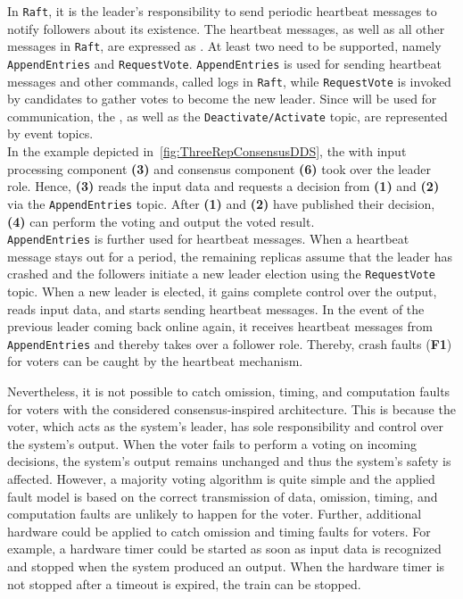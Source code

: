 In \texttt{Raft}, it is the leader's responsibility to send periodic heartbeat messages to notify followers about its existence.
The heartbeat messages, as well as all other messages in \texttt{Raft}, are expressed as .
At least two  need to be supported, namely \texttt{AppendEntries} and \texttt{RequestVote}.
\texttt{AppendEntries} is used for sending heartbeat messages and other commands, called logs in \texttt{Raft}, while \texttt{RequestVote} is invoked by candidates to gather votes to become the new leader.
Since  will be used for communication, the , as well as the \texttt{Deactivate/Activate} topic, are represented by  event topics.
\\

In the example depicted in~\autoref{fig:ThreeRepConsensusDDS}, the  with input processing component \textbf{(3)} and consensus component \textbf{(6)} took over the leader role.
Hence, \textbf{(3)} reads the input data and requests a decision from \textbf{(1)} and \textbf{(2)} via the \texttt{AppendEntries} topic.
After \textbf{(1)} and \textbf{(2)} have published their decision, \textbf{(4)} can perform the voting and output the voted result.
\\

\texttt{AppendEntries} is further used for heartbeat messages.
When a heartbeat message stays out for a period, the remaining replicas assume that the leader has crashed and the followers initiate a new leader election using the \texttt{RequestVote} topic.
When a new leader is elected, it gains complete control over the output, reads input data, and starts sending heartbeat messages.
In the event of the previous leader coming back online again, it receives heartbeat messages from \texttt{AppendEntries} and thereby takes over a follower role.
Thereby, crash faults (\textbf{F1}) for voters can be caught by the heartbeat mechanism.

Nevertheless, it is not possible to catch omission, timing, and computation faults for voters with the considered consensus-inspired architecture.
This is because the voter, which acts as the system's leader, has sole responsibility and control over the system's output.
When the voter fails to perform a voting on incoming decisions, the system's output remains unchanged and thus the system's safety is affected.
However, a majority voting algorithm is quite simple and the applied fault model is based on the correct transmission of data, omission, timing, and computation faults are unlikely to happen for the voter.
Further, additional hardware could be applied to catch omission and timing faults for voters.
For example, a hardware timer could be started as soon as input data is recognized and stopped when the system produced an output.
When the hardware timer is not stopped after a timeout is expired, the train can be stopped.
\\

